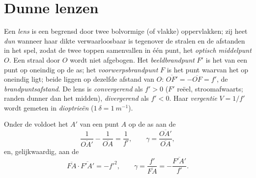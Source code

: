 \section{Dunne lenzen}

\begin{definition}\label{def:b1:mirrors-thin-lenses:lens}
Een \emph{lens} is een  begrensd door twee bolvormige (of
vlakke) oppervlakken; zij heet \emph{dun} wanneer haar dikte verwaarloosbaar
is tegenover de stralen en de afstanden in het spel, zodat de twee toppen
samenvallen in één punt, het \emph{optisch middelpunt} $O$. Een straal
door $O$ wordt niet afgebogen. Het \emph{beeldbrandpunt} $F'$ is het 
van een punt op oneindig op de as; het \emph{voorwerpsbrandpunt} $F$ is het
punt waarvan het  op oneindig ligt; beide liggen op dezelfde afstand van
$O$: $\overline{OF'} = -\overline{OF} = f'$, de \emph{brandpuntsafstand}.
De lens is \emph{convergerend} als $f' > 0$ ($F'$ reëel, stroomafwaarts;
randen dunner dan het midden), \emph{divergerend} als $f' < 0$. Haar
\emph{vergentie} $V = 1/f'$ wordt gemeten in \emph{dioptrieën}
($\qty{1}{\delta} = \qty{1}{m^{-1}}$).
\end{definition}

\begin{theorem}\label{thm:b1:mirrors-thin-lenses:lensconj}
Onder de  voldoet het  $A'$ van een punt $A$ op de
as aan de 
\[
\frac{1}{\overline{OA'}} - \frac{1}{\overline{OA}} = \frac{1}{f'},
\qquad
\gamma = \frac{\overline{OA'}}{\overline{OA}},
\]
en, gelijkwaardig, aan de 
\[
\overline{FA}\cdot\overline{F'A'} = -f'^2,
\qquad
\gamma = \frac{f'}{\overline{FA}} = -\frac{\overline{F'A'}}{f'} .
\]
\end{theorem}

